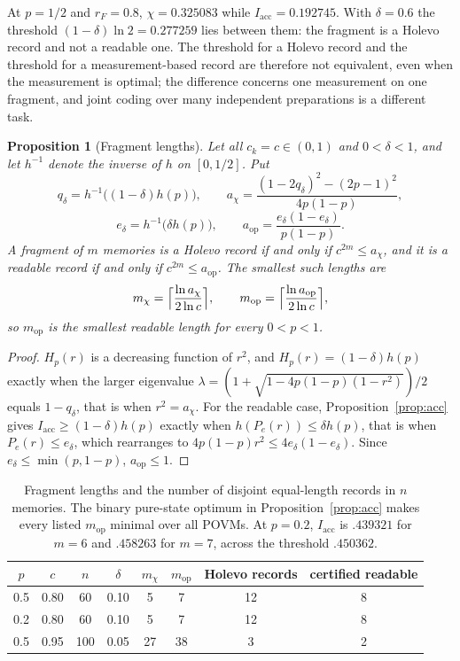 \documentclass[12pt,a4paper]{article}
\newtheorem{proposition}[theorem]{Proposition}
\begin{document}
At $p=1/2$ and $r_F=0.8$, $\chi=0.325083$ while $I_{\mathrm{acc}}=0.192745$. With $\delta=0.6$ the threshold $(1-\delta)\ln2=0.277259$ lies between them: the fragment is a Holevo record and not a readable one. The threshold for a Holevo record and the threshold for a measurement-based record are therefore not equivalent, even when the measurement is optimal; the difference concerns one measurement on one fragment, and joint coding over many independent preparations is a different task.

\begin{proposition}[Fragment lengths]
\label{prop:lengths}
Let all $c_k=c\in(0,1)$ and $0<\delta<1$, and let $h^{-1}$ denote the inverse of $h$ on $[0,1/2]$. Put
\[
q_\delta=h^{-1}\bigl((1-\delta)h(p)\bigr),\qquad
a_\chi=\frac{(1-2q_\delta)^2-(2p-1)^2}{4p(1-p)},
\]
\[
e_\delta=h^{-1}\bigl(\delta h(p)\bigr),\qquad
a_{\mathrm{op}}=\frac{e_\delta(1-e_\delta)}{p(1-p)} .
\]
A fragment of $m$ memories is a Holevo record if and only if $c^{2m}\le a_\chi$, and it is a readable record if and only if $c^{2m}\le a_{\mathrm{op}}$. The smallest such lengths are
\[
m_\chi=\Bigl\lceil\frac{\ln a_\chi}{2\ln c}\Bigr\rceil,\qquad
m_{\mathrm{op}}=\Bigl\lceil\frac{\ln a_{\mathrm{op}}}{2\ln c}\Bigr\rceil ,
\]
so $m_{\mathrm{op}}$ is the smallest readable length for every $0<p<1$.
\end{proposition}

\begin{proof}
$H_p(r)$ is a decreasing function of $r^2$, and $H_p(r)=(1-\delta)h(p)$ exactly when the larger eigenvalue $\lambda=(1+\sqrt{1-4p(1-p)(1-r^2)})/2$ equals $1-q_\delta$, that is when $r^2=a_\chi$. For the readable case, Proposition~\ref{prop:acc} gives $I_{\mathrm{acc}}\ge(1-\delta)h(p)$ exactly when $h(P_e(r))\le\delta h(p)$, that is when $P_e(r)\le e_\delta$, which rearranges to $4p(1-p)r^2\le4e_\delta(1-e_\delta)$. Since $e_\delta\le\min(p,1-p)$, $a_{\mathrm{op}}\le1$.
\end{proof}

\begin{table}[ht]
\centering
\small
\begin{tabular}{cccc|cc|cc}
\toprule
$p$ & $c$ & $n$ & $\delta$ & $m_\chi$ & $m_{\mathrm{op}}$ & Holevo records & certified readable\\
\midrule
0.5 & 0.80 & 60 & 0.10 & 5 & 7 & 12 & 8\\
0.2 & 0.80 & 60 & 0.10 & 5 & 7 & 12 & 8\\
0.5 & 0.95 & 100 & 0.05 & 27 & 38 & 3 & 2\\
\bottomrule
\end{tabular}
\caption{Fragment lengths and the number of disjoint equal-length records in $n$ memories. The binary pure-state optimum in Proposition~\ref{prop:acc} makes every listed $m_{\mathrm{op}}$ minimal over all POVMs. At $p=0.2$, $I_{\mathrm{acc}}$ is $.439321$ for $m=6$ and $.458263$ for $m=7$, across the threshold $.450362$.}
\label{tab:lengths}
\end{table}
\end{document}
